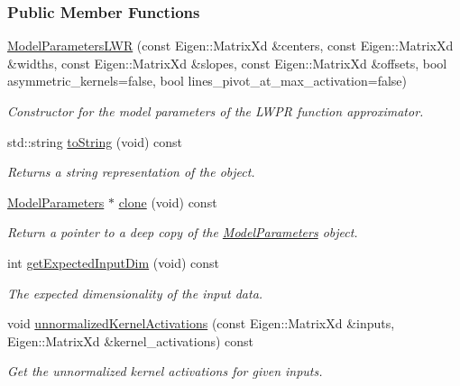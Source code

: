 \subsubsection*{Public Member Functions}
\begin{DoxyCompactItemize}
\item 
\hyperlink{classDmpBbo_1_1ModelParametersLWR_a59a8b6f6a51c64625dc901a5446a23a3}{Model\+Parameters\+L\+W\+R} (const Eigen\+::\+Matrix\+Xd \&centers, const Eigen\+::\+Matrix\+Xd \&widths, const Eigen\+::\+Matrix\+Xd \&slopes, const Eigen\+::\+Matrix\+Xd \&offsets, bool asymmetric\+\_\+kernels=false, bool lines\+\_\+pivot\+\_\+at\+\_\+max\+\_\+activation=false)
\begin{DoxyCompactList}\small\item\em Constructor for the model parameters of the L\+W\+P\+R function approximator. \end{DoxyCompactList}\item 
std\+::string \hyperlink{classDmpBbo_1_1ModelParametersLWR_a1aca816b42cf0d36118be0ab91120d77}{to\+String} (void) const 
\begin{DoxyCompactList}\small\item\em Returns a string representation of the object. \end{DoxyCompactList}\item 
\hyperlink{classDmpBbo_1_1ModelParameters}{Model\+Parameters} $\ast$ \hyperlink{classDmpBbo_1_1ModelParametersLWR_a0a71d403a2e0560e058c03394648d773}{clone} (void) const 
\begin{DoxyCompactList}\small\item\em Return a pointer to a deep copy of the \hyperlink{classDmpBbo_1_1ModelParameters}{Model\+Parameters} object. \end{DoxyCompactList}\item 
int \hyperlink{classDmpBbo_1_1ModelParametersLWR_af5a550bcf65d5a29a153a594cc4e3fa1}{get\+Expected\+Input\+Dim} (void) const 
\begin{DoxyCompactList}\small\item\em The expected dimensionality of the input data. \end{DoxyCompactList}\item 
void \hyperlink{classDmpBbo_1_1ModelParametersLWR_ad061d436c92cce36d0ed724774790a43}{unnormalized\+Kernel\+Activations} (const Eigen\+::\+Matrix\+Xd \&inputs, Eigen\+::\+Matrix\+Xd \&kernel\+\_\+activations) const 
\begin{DoxyCompactList}\small\item\em Get the unnormalized kernel activations for given inputs. \end{DoxyCompactList}\item 

\end{DoxyCompactItemize}
